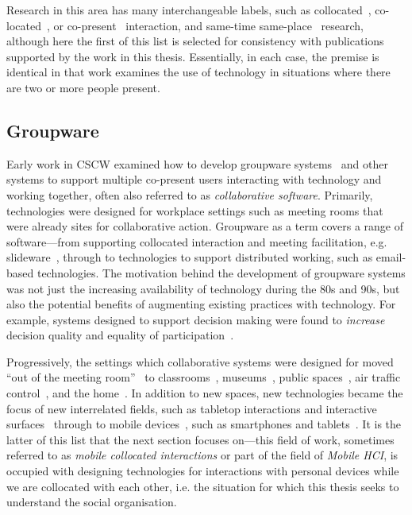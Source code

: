 Research in this area has many interchangeable labels, such as collocated~\citep{Lucero2013}, co-located~\citep{Jarusriboonchai2014}, or co-present~\citep{Cole2003} interaction, and same-time same-place~\citep{Fischer2016} research, although here the first of this list is selected for consistency with publications supported by the work in this thesis.
Essentially, in each case, the premise is identical in that work examines the use of technology in situations where there are two or more people present.






\subsection{Groupware}\label{sec:background litreview design groupware}
\begin{revisedsubmission}
Early work in \ac{CSCW} examined how to develop groupware systems~\citep{Ellis1991} and other systems to support multiple co-present users interacting with technology and working together, often also referred to as \textit{collaborative software}.
Primarily, technologies were designed for workplace settings such as meeting rooms that were already sites for collaborative action.
Groupware as a term covers a range of software---from supporting collocated interaction and meeting facilitation, e.g. slideware~\citep{Chattopadhyay2018}, through to technologies to support distributed working, such as email-based technologies.
The motivation behind the development of groupware systems was not just the increasing availability of technology during the 80s and 90s, but also the potential benefits of augmenting existing practices with technology.
For example, systems designed to support decision making were found to \textit{increase} decision quality and equality of participation~\citep{Olson1993}.

Progressively, the settings which collaborative systems were designed for moved ``out of the meeting room''~\citep{Bergqvist1999} to classrooms~\citep{Abowd2010}, museums~\citep{Ciolfi2003}, public spaces~\citep{Reeves2011}, air traffic control~\citep{Hurter2012}, and the home~\citep{Edwards2001,Crabtree2016}.
In addition to new spaces, new technologies became the focus of new interrelated fields, such as tabletop interactions and interactive surfaces~\citep{Gjerlufsen2011,Jones2012} through to mobile devices~\citep{Bellotti1996},  such as smartphones and tablets~\citep{Lucero2012}.
It is the latter of this list that the next section focuses on---this field of work, sometimes referred to as \textit{mobile collocated interactions} or part of the field of \textit{Mobile \ac{HCI}}, is occupied with designing technologies for interactions with personal devices while we are collocated with each other, i.e. the situation for which this thesis seeks to understand the social organisation.
\end{revisedsubmission}



